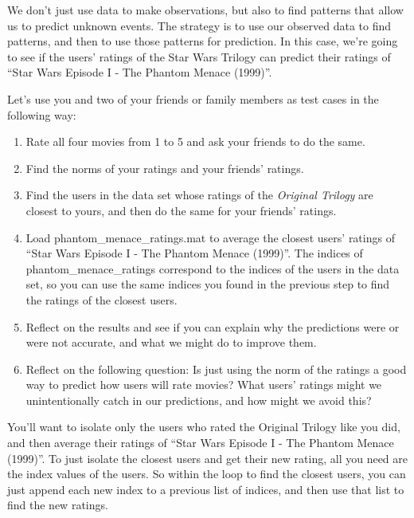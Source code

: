 \documentclass{ximera}
\begin{document}
    \begin{exploration}

    We don't just use data to make observations, but also to find patterns that allow us to predict unknown events. The strategy is to use our observed data to find patterns, and then to use those patterns for prediction. In this case, we're going to see if the users' ratings of the Star Wars Trilogy can predict their ratings of ``Star Wars Episode I - The Phantom Menace (1999)''. 

    \begin{problem}
    
      Let's use you and two of your friends or family members as test cases in the following way: 
    
    \begin{enumerate}
    
      \item  Rate all four movies from 1 to 5 and ask your friends to do the same. 
      \item Find the norms of your ratings and your friends' ratings.
      \item Find the users in the data set whose ratings of the \emph{Original Trilogy} are closest to yours, and then do the same for your friends' ratings.
      \item Load phantom\_menace\_ratings.mat to average the closest users' ratings of ``Star Wars Episode I - The Phantom Menace (1999)''. The indices of phantom\_menace\_ratings correspond to the indices of the users in the data set, so you can use the same indices you found in the previous step to find the ratings of the closest users.
      \item Reflect on the results and see if you can explain why the predictions were or were not accurate, and what we might do to improve them.
      \item Reflect on the following question: Is just using the norm of the ratings a good way to predict how users will rate movies? What users' ratings might we unintentionally catch in our predictions, and how might we avoid this?
    \end{enumerate}


      You'll want to isolate only the users who rated the Original Trilogy like you did, and then average their ratings of ``Star Wars Episode I - The Phantom Menace (1999)''. To just isolate the closest users and get their new rating, all you need are the index values of the users. So within the loop to find the closest users, you can just append each new index to a previous list of indices, and then use that list to find the new ratings.


\end{problem}
\end{exploration}
\end{document}
